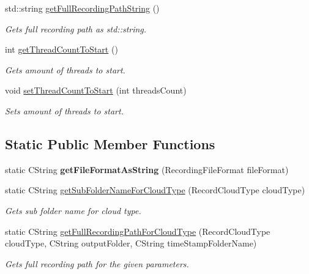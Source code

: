 \begin{DoxyCompactItemize}
std\+::string \hyperlink{class_recording_configuration_aa3becb682d9dd1ae2799bc37a65f17be}{get\+Full\+Recording\+Path\+String} ()
\begin{DoxyCompactList}\small\item\em Gets full recording path as std\+::string. \end{DoxyCompactList}\item 
int \hyperlink{class_recording_configuration_a48d2a54ab74dba016f70d7215cc4794d}{get\+Thread\+Count\+To\+Start} ()
\begin{DoxyCompactList}\small\item\em Gets amount of threads to start. \end{DoxyCompactList}\item 
void \hyperlink{class_recording_configuration_a024b7aff539119d56fae3cc28d8a85e5}{set\+Thread\+Count\+To\+Start} (int threads\+Count)
\begin{DoxyCompactList}\small\item\em Sets amount of threads to start. \end{DoxyCompactList}\end{DoxyCompactItemize}
\subsection*{Static Public Member Functions}
\begin{DoxyCompactItemize}
\item 
\hypertarget{class_recording_configuration_aacc5173ed0be04694318ab527b106b66}{}static C\+String {\bfseries get\+File\+Format\+As\+String} (Recording\+File\+Format file\+Format)\label{class_recording_configuration_aacc5173ed0be04694318ab527b106b66}

\item 
static C\+String \hyperlink{class_recording_configuration_ae3a1154cb624c0302ea9c199473f846f}{get\+Sub\+Folder\+Name\+For\+Cloud\+Type} (Record\+Cloud\+Type cloud\+Type)
\begin{DoxyCompactList}\small\item\em Gets sub folder name for cloud type. \end{DoxyCompactList}\item 
static C\+String \hyperlink{class_recording_configuration_a6f23c7982d24a9c46587f936a37f9f73}{get\+Full\+Recording\+Path\+For\+Cloud\+Type} (Record\+Cloud\+Type cloud\+Type, C\+String output\+Folder, C\+String time\+Stamp\+Folder\+Name)
\begin{DoxyCompactList}\small\item\em Gets full recording path for the given parameters. \end{DoxyCompactList}\end{DoxyCompactItemize}
